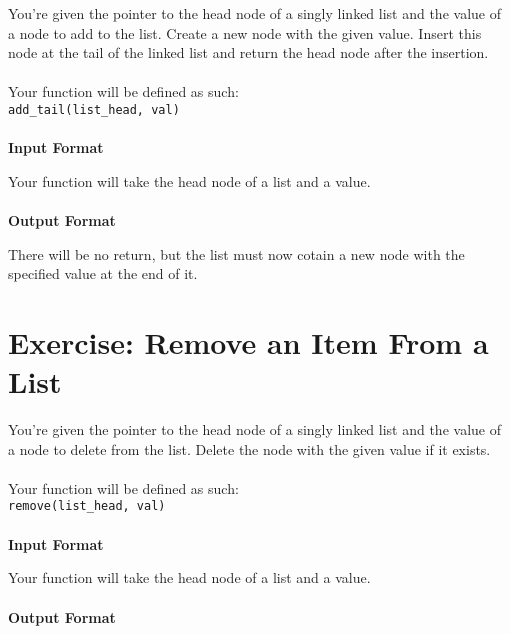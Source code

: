 \documentclass{42-en}
\begin{document}
\exnumber{\exercicenumber}

\makeheaderfiles
    You're given the pointer to the head node of a singly linked list and
    the value of a node to add to the list. Create a new node with the given
    value. Insert this node at the tail of the linked list and return the head
    node after the insertion.\\
    \\
    Your function will be defined as such:\\
    \texttt{add\_tail(list\_head, val)}\\
    \\
    \textbf{Input Format}

    Your function will take the head node of a list and a value.\\
    \\
    \textbf{Output Format}

    There will be no return, but the list must now cotain a new node with the specified value at the end of it.

\nextexercice

\chapter{Exercise\exercicenumber: Remove an Item From a List}

\exnumber{\exercicenumber}

\makeheaderfiles
    You're given the pointer to the head node of a singly linked list and
    the value of a node to delete from the list. Delete the node with the given
    value if it exists.\\
    \\
    Your function will be defined as such:\\
    \texttt{remove(list\_head, val)}\\
    \\
    \textbf{Input Format}

    Your function will take the head node of a list and a value.\\
    \\
    \textbf{Output Format}
\end{document}
